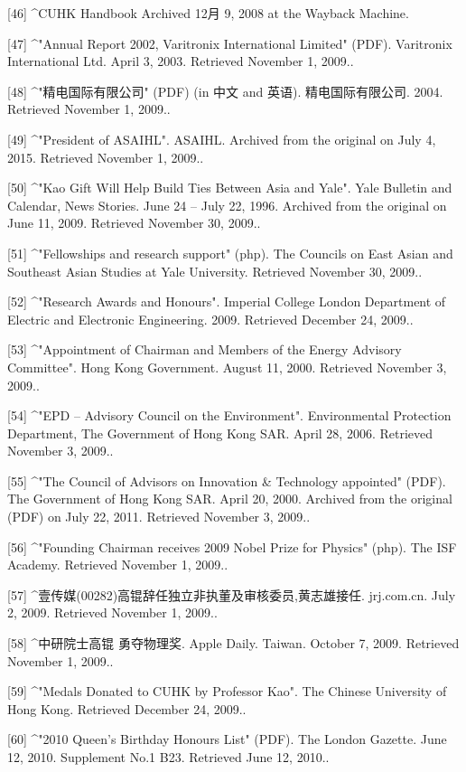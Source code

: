 [46]
^CUHK Handbook Archived 12月 9, 2008 at the Wayback Machine.

[47]
^"Annual Report 2002, Varitronix International Limited" (PDF). Varitronix International Ltd. April 3, 2003. Retrieved November 1, 2009..

[48]
^"精电国际有限公司" (PDF) (in 中文 and 英语). 精电国际有限公司. 2004. Retrieved November 1, 2009..

[49]
^"President of ASAIHL". ASAIHL. Archived from the original on July 4, 2015. Retrieved November 1, 2009..

[50]
^"Kao Gift Will Help Build Ties Between Asia and Yale". Yale Bulletin and Calendar, News Stories. June 24 – July 22, 1996. Archived from the original on June 11, 2009. Retrieved November 30, 2009..

[51]
^"Fellowships and research support" (php). The Councils on East Asian and Southeast Asian Studies at Yale University. Retrieved November 30, 2009..

[52]
^"Research Awards and Honours". Imperial College London Department of Electric and Electronic Engineering. 2009. Retrieved December 24, 2009..

[53]
^"Appointment of Chairman and Members of the Energy Advisory Committee". Hong Kong Government. August 11, 2000. Retrieved November 3, 2009..

[54]
^"EPD – Advisory Council on the Environment". Environmental Protection Department, The Government of Hong Kong SAR. April 28, 2006. Retrieved November 3, 2009..

[55]
^"The Council of Advisors on Innovation & Technology appointed" (PDF). The Government of Hong Kong SAR. April 20, 2000. Archived from the original (PDF) on July 22, 2011. Retrieved November 3, 2009..

[56]
^"Founding Chairman receives 2009 Nobel Prize for Physics" (php). The ISF Academy. Retrieved November 1, 2009..

[57]
^壹传媒(00282)高锟辞任独立非执董及审核委员,黄志雄接任. jrj.com.cn. July 2, 2009. Retrieved November 1, 2009..

[58]
^中研院士高锟 勇夺物理奖. Apple Daily. Taiwan. October 7, 2009. Retrieved November 1, 2009..

[59]
^"Medals Donated to CUHK by Professor Kao". The Chinese University of Hong Kong. Retrieved December 24, 2009..

[60]
^"2010 Queen's Birthday Honours List" (PDF). The London Gazette. June 12, 2010. Supplement No.1 B23. Retrieved June 12, 2010..

